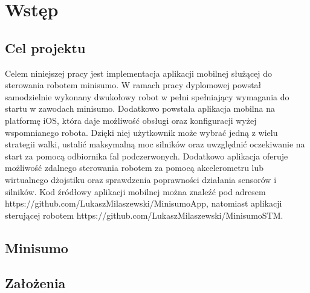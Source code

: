 \chapter{Wstęp}
\section{Cel projektu}
Celem niniejszej pracy jest implementacja aplikacji mobilnej służącej do sterowania robotem minisumo. W ramach pracy dyplomowej powstał samodzielnie wykonany dwukołowy robot w pełni spełniający wymagania do startu w zawodach minisumo. Dodatkowo powstała aplikacja mobilna na platformę iOS, która daje możliwość obsługi oraz konfiguracji wyżej wspomnianego robota. Dzięki niej użytkownik może wybrać jedną z wielu strategii walki, ustalić maksymalną moc silników oraz uwzględnić oczekiwanie na start za pomocą odbiornika fal podczerwonych. Dodatkowo aplikacja oferuje możliwość zdalnego sterowania robotem za pomocą akcelerometru lub wirtualnego dżojstiku oraz sprawdzenia poprawności działania sensorów i silników. Kod źródłowy aplikacji mobilnej można znaleźć pod adresem https://github.com/LukaszMilaszewski/MinisumoApp, natomiast aplikacji sterującej robotem https://github.com/LukaszMilaszewski/MinisumoSTM.  

\section{Minisumo}

\section{Założenia}

